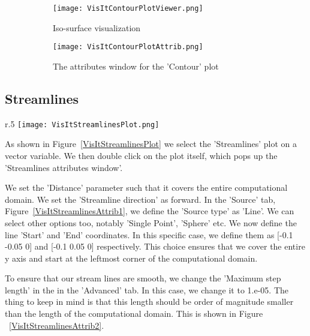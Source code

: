 \begin{figure}[htb]
  \centering
  \begin{subfigure}[b]{0.45\textwidth}
    \centering
    \texttt{[image: VisItContourPlotViewer.png]}
    \caption{Iso-surface visualization}
    \label{VisItContourPlotViewer}
  \end{subfigure}
  \begin{subfigure}[b]{0.45\textwidth}
    \centering
    \texttt{[image: VisItContourPlotAttrib.png]}
    \caption{The attributes window for the 'Contour' plot}
    \label{VisItContourPlotAttrib}
  \end{subfigure}
  \caption{}
  \label{ucf.fig9}
\end{figure}

\clearpage

\subsection{Streamlines}

\begin{wrapfigure}[9]{r}{.5\textwidth}
  \vspace{-20pt}
  \centering
  \texttt{[image: VisItStreamlinesPlot.png]}
  \caption{Selecting the 'Streamlines' plot on a vector variable}
  \label{VisItStreamlinesPlot}
\end{wrapfigure}

As shown in Figure~\ref{VisItStreamlinesPlot} we select the
'Streamlines' plot on a vector variable. We then double click on the
plot itself, which pops up the 'Streamlines attributes window'.

We set the 'Distance' parameter such that it covers the entire
computational domain. We set the 'Streamline direction' as forward. In
the 'Source' tab, Figure~\ref{VisItStreamlinesAttrib1}, we define the
'Source type' as 'Line'. We can select other options too, notably
'Single Point', 'Sphere' etc. We now define the line 'Start' and 'End'
coordinates. In this specific case, we define them as [-0.1 -0.05 0]
and [-0.1 0.05 0] respectively. This choice ensures that we cover the
entire y axis and start at the leftmost corner of the computational
domain.

To ensure that our stream lines are smooth, we change the 'Maximum
step length' in the in the 'Advanced' tab. In this case, we change it
to 1.e-05. The thing to keep in mind is that this length should be
order of magnitude smaller than the length of the computational
domain. This is shown in Figure ~\ref{VisItStreamlinesAttrib2}.


